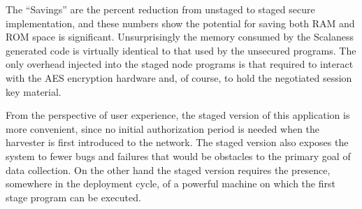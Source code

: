 The ``Savings'' are the percent reduction from unstaged to staged secure implementation, and
these numbers show the potential for saving both RAM and ROM space is significant.
Unsurprisingly the memory consumed by the Scalaness generated code is virtually identical to
that used by the unsecured programs. The only overhead injected into the staged node programs is
that required to interact with the AES encryption hardware and, of course, to hold the
negotiated session key material.

From the perspective of user experience, the staged version of this application is more
convenient, since no initial authorization period is needed when the harvester is first
introduced to the network. The staged version also exposes the system to fewer bugs and failures
that would be obstacles to the primary goal of data collection. On the other hand the staged
version requires the presence, somewhere in the deployment cycle, of a powerful machine on which
the first stage program can be executed.


